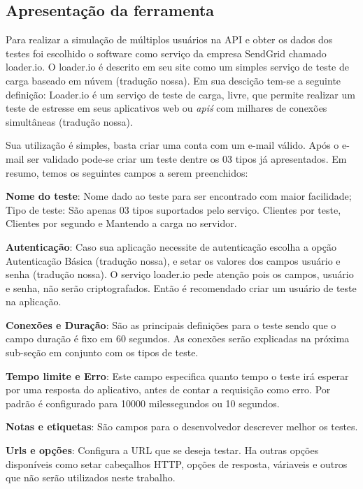 \subsection{Apresentação da ferramenta}
  
  Para realizar a simulação de múltiplos usuários na \ac{API} e obter os dados dos testes foi 
  escolhido o software como serviço da empresa SendGrid chamado loader.io. O loader.io é descrito em seu site
  como um simples serviço de teste de carga baseado em núvem (tradução nossa). Em sua descição tem-se a seguinte
  definição: Loader.io é um serviço de teste de carga, livre, que permite realizar um teste de estresse em 
  seus aplicativos web ou \textit{api\'s} com milhares de conexões simultâneas (tradução nossa).
  
  Sua utilização é simples, basta criar uma conta com um e-mail válido. Após o e-mail ser validado pode-se 
  criar um teste dentre os 03 tipos já apresentados. Em resumo, temos os seguintes campos a serem preenchidos:
  
  \textbf{Nome do teste}: Nome dado ao teste para ser encontrado com maior facilidade;
  Tipo de teste: São apenas 03 tipos suportados pelo serviço. Clientes por teste, Clientes por segundo e Mantendo 
  a carga no servidor.
  
  \textbf{Autenticação}: Caso sua aplicação necessite de autenticação escolha a opção Autenticação Básica (tradução nossa),
  e setar os valores dos campos usuário e senha (tradução nossa). O serviço loader.io pede atenção 
  pois os campos, usuário e senha, não serão criptografados. Então é recomendado criar um usuário de teste na aplicação.
  
  \textbf{Conexões e Duração}: São as principais definições para o teste sendo que o campo duração
  é fixo em 60 segundos. As conexões serão explicadas na próxima sub-seção em conjunto com os tipos de teste.
  
  \textbf{Tempo limite e Erro}: Este campo especifica quanto tempo o teste irá esperar por uma resposta do aplicativo, antes
  de contar a requisição como erro. Por padrão é configurado para 10000 milessegundos ou 10 segundos.
  
  \textbf{Notas e etiquetas}: São campos para o desenvolvedor descrever  melhor os testes.
  
  \textbf{Urls e opções}: Configura a \ac{URL} que se deseja testar. Ha outras opções disponíveis como setar cabeçalhos \ac{HTTP},
  opções de resposta, váriaveis e outros que não serão utilizados neste trabalho.
  
